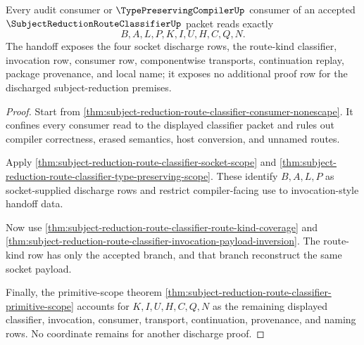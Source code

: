\begin{theorem}
\label{thm:subject-reduction-route-classifier-audit-handoff-totality}
Every audit consumer or $\TypePreservingCompilerUp$ consumer of an accepted $\SubjectReductionRouteClassifierUp$ packet reads exactly
$$
B,A,L,P,K,I,U,H,C,Q,N.
$$
The handoff exposes the four socket discharge rows, the route-kind classifier, invocation row, consumer row, componentwise transports, continuation replay, package provenance, and local name; it exposes no additional proof row for the discharged subject-reduction premises.
\end{theorem}
\begin{proof}
Start from \autoref{thm:subject-reduction-route-classifier-consumer-nonescape}. It confines every consumer read to the displayed classifier packet and rules out compiler correctness, erased semantics, host conversion, and unnamed routes.

Apply \autoref{thm:subject-reduction-route-classifier-socket-scope} and \autoref{thm:subject-reduction-route-classifier-type-preserving-scope}. These identify $B,A,L,P$ as socket-supplied discharge rows and restrict compiler-facing use to invocation-style handoff data.

Now use \autoref{thm:subject-reduction-route-classifier-route-kind-coverage} and \autoref{thm:subject-reduction-route-classifier-invocation-payload-inversion}. The route-kind row has only the accepted branch, and that branch reconstruct the same socket payload.

Finally, the primitive-scope theorem \autoref{thm:subject-reduction-route-classifier-primitive-scope} accounts for $K,I,U,H,C,Q,N$ as the remaining displayed classifier, invocation, consumer, transport, continuation, provenance, and naming rows. No coordinate remains for another discharge proof.
\end{proof}

